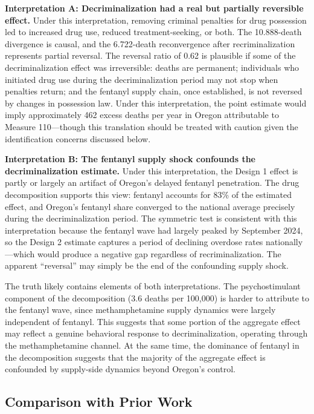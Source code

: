 \documentclass[12pt]{article}
\begin{document}
\textbf{Interpretation A: Decriminalization had a real but partially reversible effect.} Under this interpretation, removing criminal penalties for drug possession led to increased drug use, reduced treatment-seeking, or both. The 10.888-death divergence is causal, and the 6.722-death reconvergence after recriminalization represents partial reversal. The reversal ratio of 0.62 is plausible if some of the decriminalization effect was irreversible: deaths are permanent; individuals who initiated drug use during the decriminalization period may not stop when penalties return; and the fentanyl supply chain, once established, is not reversed by changes in possession law. Under this interpretation, the point estimate would imply approximately 462 excess deaths per year in Oregon attributable to Measure 110---though this translation should be treated with caution given the identification concerns discussed below.

\textbf{Interpretation B: The fentanyl supply shock confounds the decriminalization estimate.} Under this interpretation, the Design 1 effect is partly or largely an artifact of Oregon's delayed fentanyl penetration. The drug decomposition supports this view: fentanyl accounts for 83\% of the estimated effect, and Oregon's fentanyl share converged to the national average precisely during the decriminalization period. The symmetric test is consistent with this interpretation because the fentanyl wave had largely peaked by September 2024, so the Design 2 estimate captures a period of declining overdose rates nationally---which would produce a negative gap regardless of recriminalization. The apparent ``reversal'' may simply be the end of the confounding supply shock.

The truth likely contains elements of both interpretations. The psychostimulant component of the decomposition (3.6 deaths per 100,000) is harder to attribute to the fentanyl wave, since methamphetamine supply dynamics were largely independent of fentanyl. This suggests that some portion of the aggregate effect may reflect a genuine behavioral response to decriminalization, operating through the methamphetamine channel. At the same time, the dominance of fentanyl in the decomposition suggests that the majority of the aggregate effect is confounded by supply-side dynamics beyond Oregon's control.

\subsection{Comparison with Prior Work}
\end{document}
